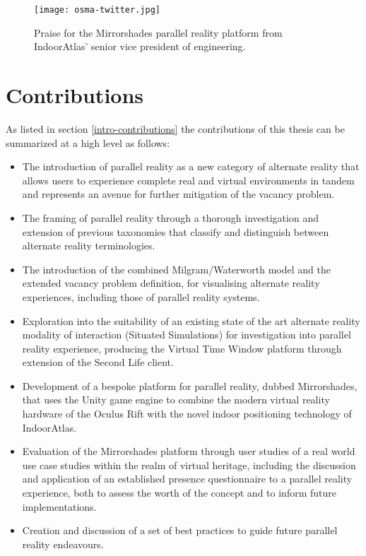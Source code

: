 \begin{figure}[t]
	\begin{center}
		\texttt{[image: osma-twitter.jpg]}
		\caption{Praise for the Mirrorshades parallel reality platform from IndoorAtlas' senior vice president of engineering.}
		\label{osma-twitter.jpg}
	\end{center}	
\end{figure}


\section{Contributions}

As listed in section \ref{intro-contributions} the contributions of this thesis can be summarized at a high level as follows:

\begin{itemize}
	\item The introduction of parallel reality as a new category of alternate reality that allows users to experience complete real and virtual environments in tandem and represents an avenue for further mitigation of the vacancy problem.
	\item The framing of parallel reality through a thorough investigation and extension of previous taxonomies that classify and distinguish between alternate reality terminologies.
	\item The introduction of the combined Milgram/Waterworth model and the extended vacancy problem definition, for visualising alternate reality experiences, including those of parallel reality systems.
	\item Exploration into the suitability of an existing state of the art alternate reality modality of interaction (Situated Simulations) for investigation into parallel reality experience, producing the Virtual Time Window platform through extension of the Second Life client.
	\item Development of a bespoke platform for parallel reality, dubbed Mirrorshades, that uses the Unity game engine to combine the modern virtual reality hardware of the Oculus Rift with the novel indoor positioning technology of IndoorAtlas.
	\item Evaluation of the Mirrorshades platform through user studies of a real world use case studies within the realm of virtual heritage, including the discussion and application of an established presence questionnaire to a parallel reality experience, both to assess the worth of the concept and to inform future implementations.
	\item Creation and discussion of a set of best practices to guide future parallel reality endeavours.
\end{itemize}

